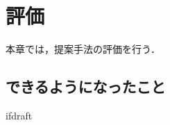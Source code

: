 \documentclass{jsarticle}
\begin{document}
    \fi
    \section{評価}
    本章では，提案手法の評価を行う．
    \subsection{できるようになったこと}

    \expandafter\ifx\csname ifdraft\endcsname\relax
\end{document}
